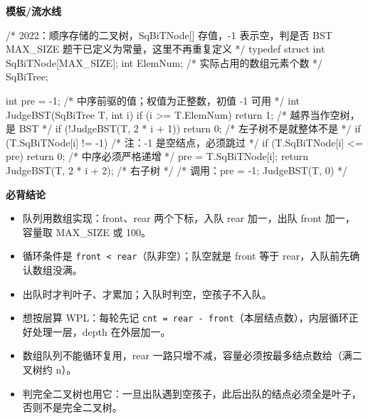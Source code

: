 \documentclass[10pt,a4paper]{ctexart}
\begin{document}
\textbf{模板/流水线}

\begin{codebox}
/* 2022：顺序存储的二叉树，SqBiTNode[] 存值，-1 表示空，判是否 BST
   MAX_SIZE 题干已定义为常量，这里不再重复定义 */
typedef struct {
    int SqBiTNode[MAX_SIZE];
    int ElemNum;                           /* 实际占用的数组元素个数 */
} SqBiTree;

int pre = -1;                              /* 中序前驱的值；权值为正整数，初值 -1 可用 */
int JudgeBST(SqBiTree T, int i) {
    if (i >= T.ElemNum) return 1;                  /* 越界当作空树，是 BST */
    if (!JudgeBST(T, 2 * i + 1)) return 0;         /* 左子树不是就整体不是 */
    if (T.SqBiTNode[i] != -1) {                    /* 注：-1 是空结点，必须跳过 */
        if (T.SqBiTNode[i] <= pre) return 0;       /* 中序必须严格递增 */
        pre = T.SqBiTNode[i];
    }
    return JudgeBST(T, 2 * i + 2);                 /* 右子树 */
}
/* 调用：pre = -1; JudgeBST(T, 0) */
\end{codebox}





\textbf{必背结论}

\begin{itemize}

\item 队列用数组实现：front、rear 两个下标，入队 rear 加一，出队 front 加一，容量取 MAX\_SIZE 或 100。

\item 循环条件是 \texttt{front < rear}（队非空）；队空就是 front 等于 rear，入队前先确认数组没满。

\item 出队时才判叶子、才累加；入队时判空，空孩子不入队。

\item 想按层算 WPL：每轮先记 \texttt{cnt = rear - front}（本层结点数），内层循环正好处理一层，depth 在外层加一。

\item 数组队列不能循环复用，rear 一路只增不减，容量必须按最多结点数给（满二叉树约 n）。

\item 判完全二叉树也用它：一旦出队遇到空孩子，此后出队的结点必须全是叶子，否则不是完全二叉树。

\end{itemize}
\end{document}
